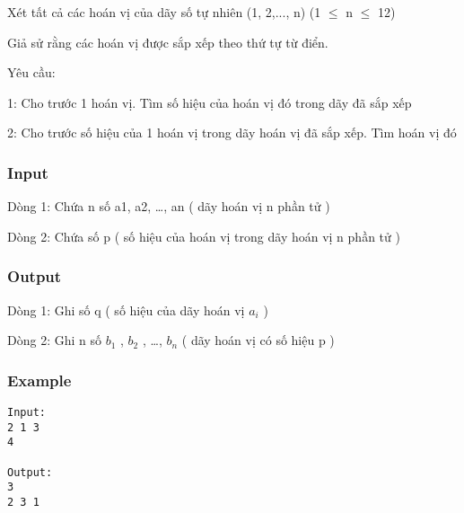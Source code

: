 



   Xét tất cả các hoán vị của dãy số tự nhiên (1, 2,..., n) (1  $\le$  n  $\le$  12)  

   Giả sử rằng các hoán vị được sắp xếp theo thứ tự từ điển.  

   Yêu cầu:  

   1: Cho trước 1 hoán vị. Tìm số hiệu của hoán vị đó trong dãy đã sắp xếp  

   2: Cho trước số hiệu của 1 hoán vị trong dãy hoán vị đã sắp xếp. Tìm hoán vị đó  

\subsubsection{   Input  }

   Dòng 1: Chứa n số a1, a2, …, an ( dãy hoán vị n phần tử )  

   Dòng 2: Chứa số p ( số hiệu của hoán vị trong dãy hoán vị n phần tử )  

\subsubsection{   Output  }

   Dòng 1: Ghi số q ( số hiệu của dãy hoán vị $a_{i}$   )  

   Dòng 2: Ghi n số $b_{1}$   , $b_{2}$   , …, $b_{n}$   ( dãy hoán vị có số hiệu p )  

\subsubsection{   Example  }
\begin{verbatim}
Input:
2 1 3
4

Output:
3
2 3 1 

\end{verbatim}
